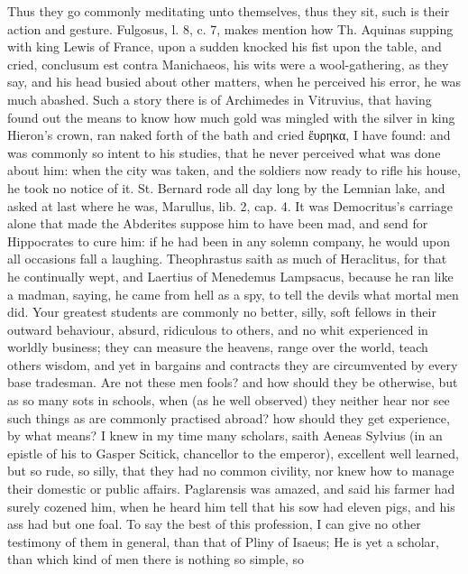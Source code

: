 {Thus they go commonly meditating unto themselves, thus they sit, such
is their action and gesture. Fulgosus, l. 8, c. 7, makes mention how
Th. Aquinas supping with king Lewis of France, upon a sudden knocked
his fist upon the table, and cried, conclusum est contra Manichaeos,
his wits were a wool-gathering, as they say, and his head busied about
other matters, when he perceived his error, he was much abashed.
Such a story there is of Archimedes in Vitruvius, that having found out
the means to know how much gold was mingled with the silver in king
Hieron's crown, ran naked forth of the bath and cried ἕυρηκα, I have
found: and was commonly so intent to his studies, that he never
perceived what was done about him: when the city was taken, and the
soldiers now ready to rifle his house, he took no notice of it. St.
Bernard rode all day long by the Lemnian lake, and asked at last where
he was, Marullus, lib. 2, cap. 4. It was Democritus's carriage alone
that made the Abderites suppose him to have been mad, and send for
Hippocrates to cure him: if he had been in any solemn company, he would
upon all occasions fall a laughing. Theophrastus saith as much of
Heraclitus, for that he continually wept, and Laertius of Menedemus
Lampsacus, because he ran like a madman, saying, he came from
hell as a spy, to tell the devils what mortal men did. Your greatest
students are commonly no better, silly, soft fellows in their outward
behaviour, absurd, ridiculous to others, and no whit experienced in
worldly business; they can measure the heavens, range over the world,
teach others wisdom, and yet in bargains and contracts they are
circumvented by every base tradesman. Are not these men fools? and how
should they be otherwise, but as so many sots in schools, when (as
he well observed) they neither hear nor see such things as are
commonly practised abroad? how should they get experience, by what
means? I knew in my time many scholars, saith Aeneas Sylvius (in
an epistle of his to Gasper Scitick, chancellor to the emperor),
excellent well learned, but so rude, so silly, that they had no common
civility, nor knew how to manage their domestic or public affairs.
Paglarensis was amazed, and said his farmer had surely cozened him,
when he heard him tell that his sow had eleven pigs, and his ass had
but one foal. To say the best of this profession, I can give no other
testimony of them in general, than that of Pliny of Isaeus; He is
yet a scholar, than which kind of men there is nothing so simple, so
}
